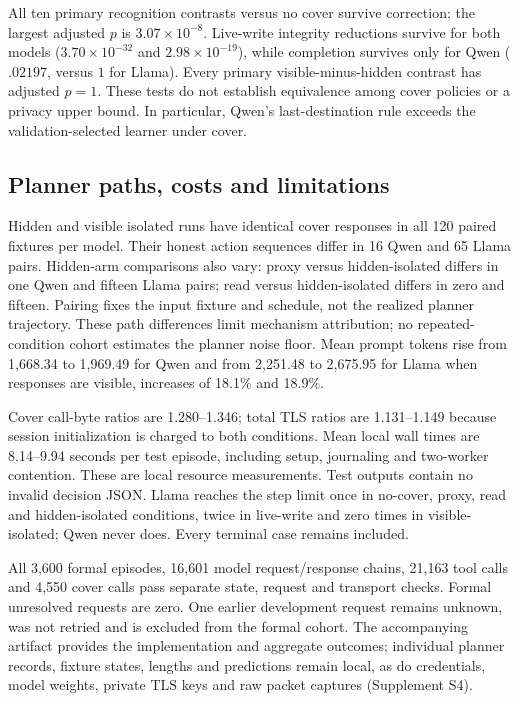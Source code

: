 All ten primary recognition contrasts versus no cover survive correction; the largest adjusted $p$ is $3.07\times10^{-8}$. Live-write integrity reductions survive for both models ($3.70\times10^{-32}$ and $2.98\times10^{-19}$), while completion survives only for Qwen ($.02197$, versus $1$ for Llama). Every primary visible-minus-hidden contrast has adjusted $p=1$. These tests do not establish equivalence among cover policies or a privacy upper bound. In particular, Qwen's last-destination rule exceeds the validation-selected learner under cover.



\subsection{Planner paths, costs and limitations}
Hidden and visible isolated runs have identical cover responses in all 120 paired fixtures per model. Their honest action sequences differ in 16 Qwen and 65 Llama pairs. Hidden-arm comparisons also vary: proxy versus hidden-isolated differs in one Qwen and fifteen Llama pairs; read versus hidden-isolated differs in zero and fifteen. Pairing fixes the input fixture and schedule, not the realized planner trajectory. These path differences limit mechanism attribution; no repeated-condition cohort estimates the planner noise floor. Mean prompt tokens rise from 1,668.34 to 1,969.49 for Qwen and from 2,251.48 to 2,675.95 for Llama when responses are visible, increases of 18.1\% and 18.9\%.

Cover call-byte ratios are 1.280--1.346; total TLS ratios are 1.131--1.149 because session initialization is charged to both conditions. Mean local wall times are 8.14--9.94 seconds per test episode, including setup, journaling and two-worker contention. These are local resource measurements. Test outputs contain no invalid decision JSON. Llama reaches the step limit once in no-cover, proxy, read and hidden-isolated conditions, twice in live-write and zero times in visible-isolated; Qwen never does. Every terminal case remains included.

All 3,600 formal episodes, 16,601 model request/response chains, 21,163 tool calls and 4,550 cover calls pass separate state, request and transport checks. Formal unresolved requests are zero. One earlier development request remains unknown, was not retried and is excluded from the formal cohort. The accompanying artifact provides the implementation and aggregate outcomes; individual planner records, fixture states, lengths and predictions remain local, as do credentials, model weights, private TLS keys and raw packet captures (Supplement S4).

